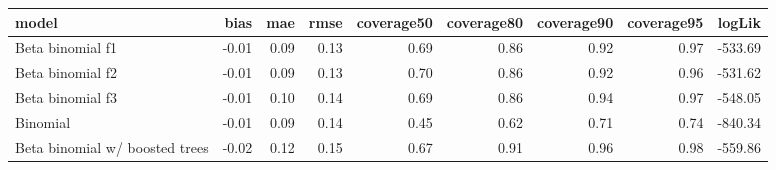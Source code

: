 \begin{table}[ht]
\centering
\begin{tabular}{lrrrrrrrr}
  \hline
model & bias & mae & rmse & coverage50 & coverage80 & coverage90 & coverage95 & logLik \\ 
  \hline
Beta binomial f1 & -0.01 & 0.09 & 0.13 & 0.69 & 0.86 & 0.92 & 0.97 & -533.69 \\ 
  Beta binomial f2 & -0.01 & 0.09 & 0.13 & 0.70 & 0.86 & 0.92 & 0.96 & -531.62 \\ 
  Beta binomial f3 & -0.01 & 0.10 & 0.14 & 0.69 & 0.86 & 0.94 & 0.97 & -548.05 \\ 
  Binomial & -0.01 & 0.09 & 0.14 & 0.45 & 0.62 & 0.71 & 0.74 & -840.34 \\ 
  Beta binomial w/ boosted trees & -0.02 & 0.12 & 0.15 & 0.67 & 0.91 & 0.96 & 0.98 & -559.86 \\ 
   \hline
\end{tabular}
\end{table}
